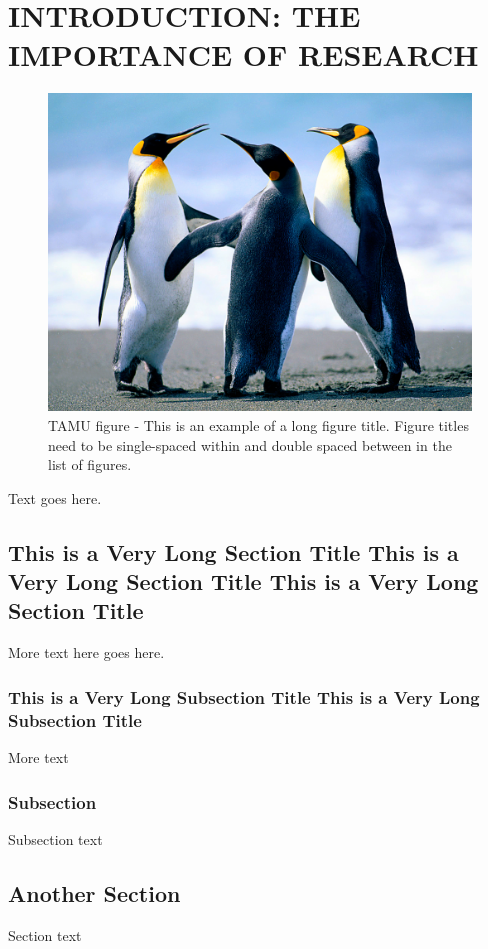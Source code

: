 %
%
%



\pagestyle{plain} %
\setcounter{page}{1}


\chapter{\uppercase {Introduction: The Importance of Research}}
\begin{figure}[H]
\centering
\includegraphics[scale=.50]{figures/Penguins.jpg}
\caption{TAMU figure - This is an example of a long figure title.  Figure titles need to be single-spaced within and double spaced between in the list of figures.}
\label{fig:tamu-fig1}
\end{figure}

Text goes here.

\section{This is a Very Long Section Title This is a Very Long Section Title This is a Very Long Section Title }

More text here goes here.

\subsection{This is a Very Long Subsection Title This is a Very Long Subsection Title}

More text
\subsection{Subsection}

Subsection text

\section{Another Section}

Section text
